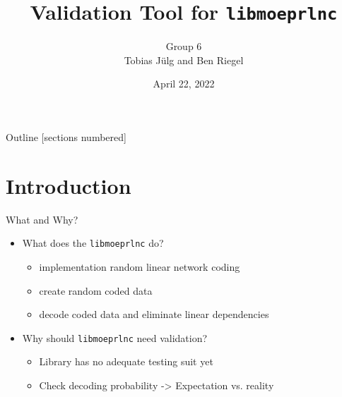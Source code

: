 \documentclass[t]{beamer} %
\title{Validation Tool for \texttt{libmoeprlnc}}
\date{April 22, 2022}
\author{Group 6\\Tobias Jülg and Ben Riegel}
\institute[TUM]{Technical University of Munich}
\begin{document}
\maketitle


\begin{frame}{Outline}
	[sections numbered]
	\tableofcontents %
\end{frame}

\section{Introduction}
\begin{frame}{What and Why?}
	\begin{itemize}
		\item What does the \texttt{libmoeprlnc} do? 
		\begin{itemize}
			\item implementation random linear network coding
			\item create random coded data
			\item decode coded data and eliminate linear dependencies
		\end{itemize}
	\end{itemize}

	\begin{itemize}
		\item Why should \texttt{libmoeprlnc} need validation? 
		\begin{itemize}
			\item Library has no adequate testing suit yet
			\item Check decoding probability -> Expectation vs. reality
		\end{itemize}
	\end{itemize}
\end{frame}

\end{document}
